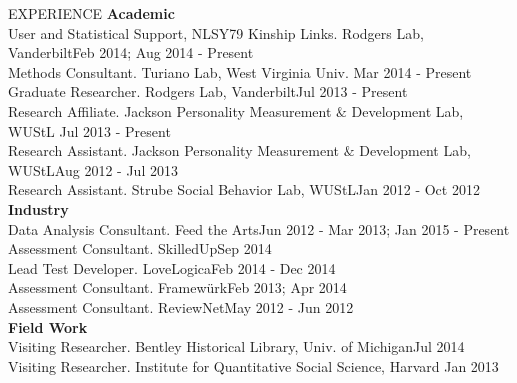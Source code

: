 \documentclass {resume}
\begin{document}
\begin{rSection}{\textrm{EXPERIENCE}}
{\large \textbf{Academic}}\\
User and Statistical Support, NLSY79 Kinship Links. Rodgers Lab, Vanderbilt\hfill Feb 2014; Aug 2014 - Present\smallskip\\%
Methods Consultant. Turiano Lab, West Virginia Univ. \hfill Mar 2014 - Present\smallskip\\
Graduate Researcher. Rodgers Lab, Vanderbilt\hfill Jul 2013 - Present\smallskip\\
Research Affiliate. Jackson Personality Measurement $\&$ Development Lab, WUStL \hfill Jul 2013 - Present\smallskip\\
Research Assistant. Jackson Personality Measurement $\&$ Development Lab, WUStL\hfill Aug 2012 - Jul 2013\smallskip\\
Research Assistant. Strube Social Behavior Lab, WUStL\hfill Jan 2012 - Oct 2012\medskip\\
{\large \textbf{Industry}}\\
Data Analysis Consultant. Feed the Arts\hfill Jun 2012 - Mar 2013; Jan 2015 - Present\smallskip\\
Assessment Consultant. SkilledUp\hfill Sep 2014\smallskip\\
Lead Test Developer. LoveLogica\hfill Feb 2014 - Dec 2014\smallskip\\
Assessment Consultant. Framew\"{u}rk\hfill Feb 2013; Apr 2014\smallskip\\
Assessment Consultant. ReviewNet\hfill May 2012 - Jun 2012\medskip\\%
{\large \textbf{Field Work}}\\
Visiting Researcher. Bentley Historical Library, Univ. of Michigan\hfill Jul 2014\smallskip\\
Visiting Researcher. Institute for Quantitative Social Science, Harvard \hfill Jan 2013%
\end{rSection}%
\end{document}
